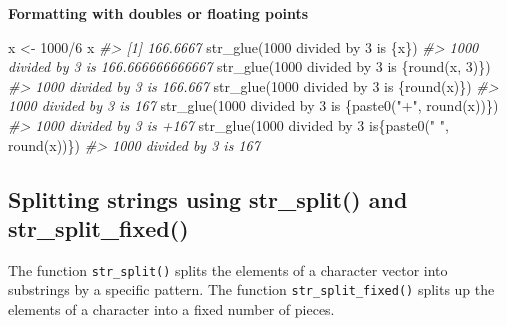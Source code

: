 \documentclass[
]{book}
\newenvironment{Shaded}{\begin{snugshade}}{\end{snugshade}}
\newcommand{\CommentTok}[1]{\textcolor[rgb]{0.56,0.35,0.01}{\textit{#1}}}
\newcommand{\DecValTok}[1]{\textcolor[rgb]{0.00,0.00,0.81}{#1}}
\newcommand{\FunctionTok}[1]{\textcolor[rgb]{0.00,0.00,0.00}{#1}}
\newcommand{\NormalTok}[1]{#1}
\newcommand{\OtherTok}[1]{\textcolor[rgb]{0.56,0.35,0.01}{#1}}
\newcommand{\SpecialCharTok}[1]{\textcolor[rgb]{0.00,0.00,0.00}{#1}}
\newcommand{\StringTok}[1]{\textcolor[rgb]{0.31,0.60,0.02}{#1}}
\begin{document}
\textbf{Formatting with doubles or floating points}

\begin{Shaded}
\begin{Highlighting}[]
\NormalTok{x }\OtherTok{\textless{}{-}} \DecValTok{1000}\SpecialCharTok{/}\DecValTok{6}
\NormalTok{x}
\CommentTok{\#\textgreater{} [1] 166.6667}
\FunctionTok{str\_glue}\NormalTok{(}\StringTok{\textquotesingle{}1000 divided by 3 is \{x\}\textquotesingle{}}\NormalTok{)}
\CommentTok{\#\textgreater{} 1000 divided by 3 is 166.666666666667}
\FunctionTok{str\_glue}\NormalTok{(}\StringTok{\textquotesingle{}1000 divided by 3 is \{round(x, 3)\}\textquotesingle{}}\NormalTok{)}
\CommentTok{\#\textgreater{} 1000 divided by 3 is 166.667}
\FunctionTok{str\_glue}\NormalTok{(}\StringTok{\textquotesingle{}1000 divided by 3 is \{round(x)\}\textquotesingle{}}\NormalTok{)}
\CommentTok{\#\textgreater{} 1000 divided by 3 is 167}
\FunctionTok{str\_glue}\NormalTok{(}\StringTok{\textquotesingle{}1000 divided by 3 is \{paste0("+", round(x))\}\textquotesingle{}}\NormalTok{)}
\CommentTok{\#\textgreater{} 1000 divided by 3 is +167}
\FunctionTok{str\_glue}\NormalTok{(}\StringTok{\textquotesingle{}1000 divided by 3 is\{paste0(" ", round(x))\}\textquotesingle{}}\NormalTok{)}
\CommentTok{\#\textgreater{} 1000 divided by 3 is 167}
\end{Highlighting}
\end{Shaded}

\hypertarget{splitting-strings-using-str_split-and-str_split_fixed}{%
\subsection{Splitting strings using str\_split() and str\_split\_fixed()}\label{splitting-strings-using-str_split-and-str_split_fixed}}

The function \texttt{str\_split()} splits the elements of a character vector into substrings by a specific pattern.
The function \texttt{str\_split\_fixed()} splits up the elements of a character into a fixed number of pieces.
\end{document}
